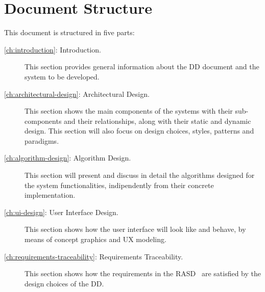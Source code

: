 \section{Document Structure}
\label{sec:structure}

This document is structured in five parts:
\begin{description}
\item[\autoref{ch:introduction}: Introduction.] This section provides general information about the DD document and the system to be developed.
\item[\autoref{ch:architectural-design}: Architectural Design.] This section shows the main components of the systems with their sub-components and their relationships, along with their static and dynamic design. This section will also focus on design choices, styles, patterns and paradigms.
\item[\autoref{ch:algorithm-design}: Algorithm Design.] This section will present and discuss in detail the algorithms designed for the system functionalities, indipendently from their concrete implementation.
\item[\autoref{ch:ui-design}: User Interface Design.] This section shows how the user interface will look like and behave, by means of concept graphics and UX modeling.
\item[\autoref{ch:requirements-traceability}: Requirements Traceability.] This section shows how the requirements in the RASD~\cite{rasd} are satisfied by the design choices of the DD.
\end{description}
